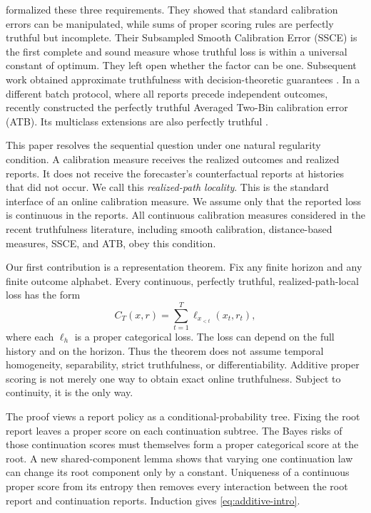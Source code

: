\documentclass[twoside]{article}
\newcommand{\1}{\mathbf 1}
\begin{document}
\citet{haghtalab2024truthfulness} formalized these three requirements. They showed that standard calibration errors can be manipulated, while sums of proper scoring rules are perfectly truthful but incomplete. Their Subsampled Smooth Calibration Error (SSCE) is the first complete and sound measure whose truthful loss is within a universal constant of optimum. They left open whether the factor can be one. Subsequent work obtained approximate truthfulness with decision-theoretic guarantees \citep{qiao2025decision}. In a different batch protocol, where all reports precede independent outcomes, \citet{hartline2026perfect} recently constructed the perfectly truthful Averaged Two-Bin calibration error (ATB). Its multiclass extensions are also perfectly truthful \citep{lu2025multiclass}.

This paper resolves the sequential question under one natural regularity condition. A calibration measure receives the realized outcomes and realized reports. It does not receive the forecaster's counterfactual reports at histories that did not occur. We call this \emph{realized-path locality}. This is the standard interface of an online calibration measure. We assume only that the reported loss is continuous in the reports. All continuous calibration measures considered in the recent truthfulness literature, including smooth calibration, distance-based measures, SSCE, and ATB, obey this condition.

Our first contribution is a representation theorem. Fix any finite horizon and any finite outcome alphabet. Every continuous, perfectly truthful, realized-path-local loss has the form
\begin{equation}
 C_T(x,r)=\sum_{t=1}^T \ell_{x_{<t}}(x_t,r_t),
 \label{eq:additive-intro}
\end{equation}
where each $\ell_h$ is a proper categorical loss. The loss can depend on the full history and on the horizon. Thus the theorem does not assume temporal homogeneity, separability, strict truthfulness, or differentiability. Additive proper scoring is not merely one way to obtain exact online truthfulness. Subject to continuity, it is the only way.

The proof views a report policy as a conditional-probability tree. Fixing the root report leaves a proper score on each continuation subtree. The Bayes risks of those continuation scores must themselves form a proper categorical score at the root. A new shared-component lemma shows that varying one continuation law can change its root component only by a constant. Uniqueness of a continuous proper score from its entropy then removes every interaction between the root report and continuation reports. Induction gives \eqref{eq:additive-intro}.
\end{document}
